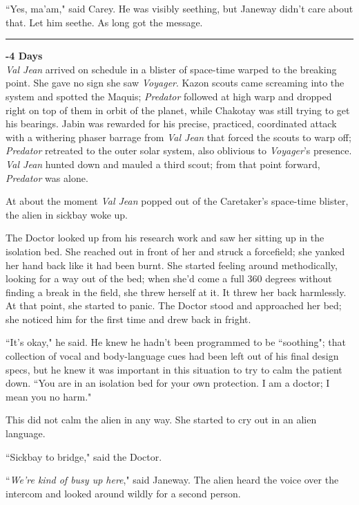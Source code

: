 \documentclass[twoside,letterpaper,12pt]{memoir}
\begin{document}
``Yes, ma'am," said Carey. He was visibly seething, but Janeway didn't care about that. Let him seethe. As long got the message.

\begin{center}\rule{3cm}{0.4 pt}\end{center} 

\noindent\textbf{-4 Days}\\

\textit{Val Jean} arrived on schedule in a blister of space-time warped to the breaking point. She gave no sign she saw \textit{Voyager}. Kazon scouts came screaming into the system and spotted the Maquis; \textit{Predator} followed at high warp and dropped right on top of them in orbit of the planet, while Chakotay was still trying to get his bearings. Jabin was rewarded for his precise, practiced, coordinated attack with a withering phaser barrage from \textit{Val Jean} that forced the scouts to warp off; \textit{Predator} retreated to the outer solar system, also oblivious to \textit{Voyager}'s presence. \textit{Val Jean} hunted down and mauled a third scout; from that point forward, \textit{Predator} was alone. 

At about the moment \textit{Val Jean} popped out of the Caretaker's space-time blister, the alien in sickbay woke up. 

The Doctor looked up from his research work and saw her sitting up in the isolation bed. She reached out in front of her and struck a forcefield; she yanked her hand back like it had been burnt. She started feeling around methodically, looking for a way out of the bed; when she'd come a full 360 degrees without finding a break in the field, she threw herself at it. It threw her back harmlessly. At that point, she started to panic. The Doctor stood and approached her bed; she noticed him for the first time and drew back in fright. 

``It's okay," he said. He knew he hadn't been programmed to be ``soothing"; that collection of vocal and body-language cues had been left out of his final design specs, but he knew it was important in this situation to try to calm the patient down. ``You are in an isolation bed for your own protection. I am a doctor; I mean you no harm." 

This did not calm the alien in any way. She started to cry out in an alien language. 

``Sickbay to bridge," said the Doctor. 

``\textit{We're kind of busy up here}," said Janeway. The alien heard the voice over the intercom and looked around wildly for a second person. 
\end{document}
